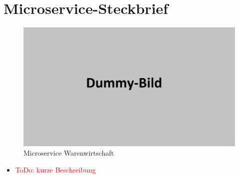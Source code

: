 \section{Microservice-Steckbrief}
\label{sec: Microservice-Steckbrief}

\begin{figure}[H]
	\begin{center}
	\includegraphics[width=0.65 \textwidth]{./Bilder/dummy.png}
	\end{center}
	\caption{Microservice Warenwirtschaft}
	\label{pic: Microservice Warenwirtschaft}
\end{figure}


\begin{itemize}
	\item \textcolor{red}{ToDo: kurze Beschreibung}
\end{itemize}
